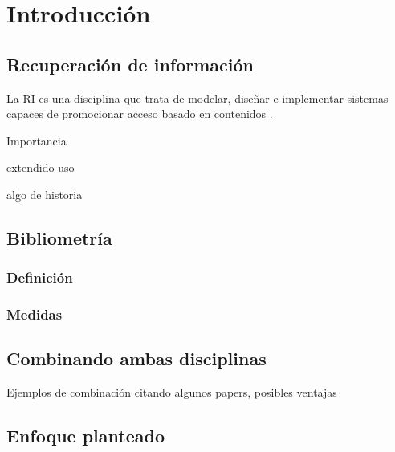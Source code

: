 \chapter*{}
\chapter{Introducción}
\section{Recuperación de información}
La \acrfull{RI} es una disciplina que trata de modelar, diseñar e implementar sistemas capaces de promocionar acceso basado en contenidos \cite{RI}.

Importancia 

extendido uso

algo de historia
\section{Bibliometría}
\subsection{Definición}
\subsection{Medidas}

\section{Combinando ambas disciplinas}
Ejemplos de combinación citando algunos papers, posibles ventajas

\section{Enfoque planteado}


